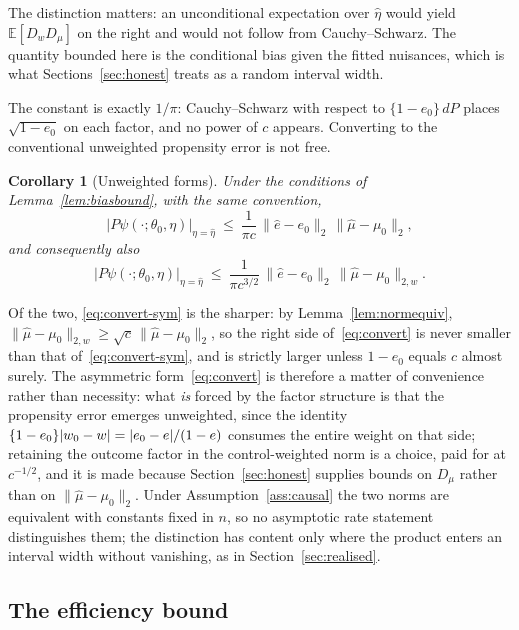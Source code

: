 \documentclass[11pt]{article}
\theoremstyle{plain}
\newtheorem{corollary}[theorem]{Corollary}
\theoremstyle{definition}
\theoremstyle{remark}
\newcommand{\E}{\mathbb{E}}
\newcommand{\ez}{e_0}
\newcommand{\mz}{\mu_0}
\newcommand{\wz}{w_0}
\newcommand{\ehat}{\widehat{e}}
\newcommand{\mhat}{\widehat{\mu}}
\newcommand{\Dw}{D_w}
\newcommand{\Dm}{D_\mu}
\newcommand{\Ltwo}[1]{\lVert #1 \rVert_{2}}
\newcommand{\Lw}[1]{\lVert #1 \rVert_{2,w}}
\DeclarePairedDelimiter{\abs}{\lvert}{\rvert}
\begin{document}
\noindent The distinction matters: an unconditional expectation over
$\widehat\eta$ would yield $\E[\Dw\Dm]$ on the right and would not follow from
Cauchy--Schwarz. The quantity bounded here is the conditional bias given the
fitted nuisances, which is what Sections~\ref{sec:honest} treats as a random
interval width.

\noindent The constant is exactly $1/\pi$: Cauchy--Schwarz with respect to
$\{1-\ez\}\,dP$ places $\sqrt{1-\ez}$ on each factor, and no power of $c$
appears. Converting to the conventional unweighted propensity error is not free.

\begin{corollary}[Unweighted forms]\label{cor:convert}
Under the conditions of Lemma~\ref{lem:biasbound}, with the same convention,
\begin{equation}\label{eq:convert-sym}
  \bigl\lvert P\psi(\cdot;\theta_0,\eta)\bigr\rvert_{\eta=\widehat\eta}
  \ \le\ \frac1{\pi c}\,\Ltwo{\ehat-\ez}\,\Ltwo{\mhat-\mz},
\end{equation}
and consequently also
\begin{equation}\label{eq:convert}
  \bigl\lvert P\psi(\cdot;\theta_0,\eta)\bigr\rvert_{\eta=\widehat\eta}
  \ \le\ \frac1{\pi c^{3/2}}\,\Ltwo{\ehat-\ez}\,\Lw{\mhat-\mz}.
\end{equation}
\end{corollary}

\noindent Of the two, \eqref{eq:convert-sym} is the sharper: by
Lemma~\ref{lem:normequiv}, $\Lw{\mhat-\mz}\ge\sqrt c\,\Ltwo{\mhat-\mz}$, so the
right side of~\eqref{eq:convert} is never smaller than that
of~\eqref{eq:convert-sym}, and is strictly larger unless $1-\ez$ equals $c$
almost surely. The asymmetric form~\eqref{eq:convert} is therefore a matter of
convenience rather than necessity: what \emph{is} forced by the factor structure
is that the propensity error emerges unweighted, since the identity
$\{1-\ez\}\abs{\wz-w}=\abs{\ez-e}/(1-e)$ consumes the entire weight on that side;
retaining the outcome factor in the control-weighted norm is a choice, paid for
at $c^{-1/2}$, and it is made because Section~\ref{sec:honest} supplies bounds on
$\Dm$ rather than on $\Ltwo{\mhat-\mz}$. Under
Assumption~\ref{ass:causal} the two norms are equivalent
with constants fixed in $n$, so no asymptotic rate statement distinguishes them;
the distinction has content only where the product enters an interval width
without vanishing, as in Section~\ref{sec:realised}.

\subsection{The efficiency bound}
\end{document}
